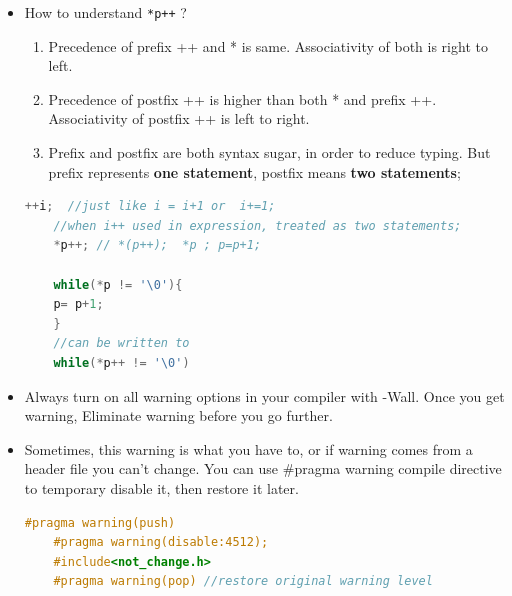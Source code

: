 \documentclass[a4paper,11pt,twoside]{book}
\begin{document}
\begin{itemize}
	\item How to understand \texttt{*p++} ?
	
	\begin{enumerate}
		\item Precedence of prefix ++ and * is same. Associativity of both is right to left.
		\item Precedence of postfix ++ is higher than both * and prefix ++. Associativity of postfix ++ is left to right.
		\item Prefix and postfix are both syntax sugar, in order to reduce typing.   But prefix represents \textbf{one statement}, postfix means \textbf{two statements};
	\end{enumerate}
	
	\begin{lstlisting}[frame=single, language=c++]
	++i;  //just like i = i+1 or  i+=1;
	//when i++ used in expression, treated as two statements;
	*p++; // *(p++);  *p ; p=p+1;
	
	while(*p != '\0'){
	p= p+1;
	}
	//can be written to
	while(*p++ != '\0')
	\end{lstlisting}
	
	\item Always turn on all warning options in your compiler with -Wall. Once you get warning, Eliminate warning before you go further.
	
	\item Sometimes, this warning is what you have to, or if warning comes from a header file you can't change. You can use \#pragma warning compile directive to temporary disable it, then restore it later.
	\begin{lstlisting}[frame=single, language=c++]
	#pragma warning(push)
	#pragma warning(disable:4512);
	#include<not_change.h>
	#pragma warning(pop) //restore original warning level
	\end{lstlisting}
	
\end{itemize}


\end{document}
